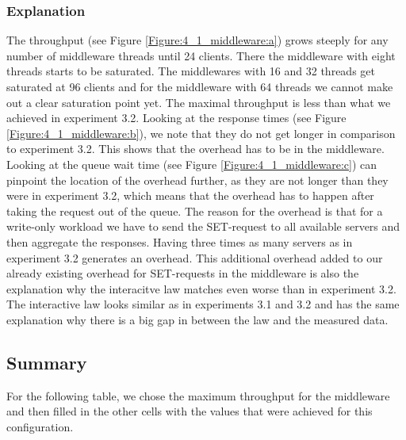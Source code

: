 \documentclass[11pt,a4paper]{article}
\begin{document}
\subsubsection{Explanation}
The throughput (see Figure \ref{Figure:4_1_middleware:a}) grows steeply for any number of middleware threads until 24 clients. There the middleware with eight threads starts to be saturated. The middlewares with 16 and 32 threads get saturated at 96 clients and for the middleware with 64 threads we cannot make out a clear saturation point yet. The maximal throughput is less than what we achieved in experiment 3.2. Looking at the response times (see Figure \ref{Figure:4_1_middleware:b}), we note that they do not get longer in comparison to experiment 3.2. This shows that the overhead has to be in the middleware. Looking at the queue wait time (see Figure \ref{Figure:4_1_middleware:c}) can pinpoint the location of the overhead further, as they are not longer than they were in experiment 3.2, which means that the overhead has to happen after taking the request out of the queue. The reason for the overhead is that for a write-only workload we have to send the SET-request to all available servers and then aggregate the responses. Having three times as many servers as in experiment 3.2 generates an overhead. This additional overhead added to our already existing overhead for SET-requests in the middleware is also the explanation why the interacitve law  matches even worse than in experiment 3.2. The interactive law looks similar as in experiments 3.1 and 3.2 and has the same explanation why there is a big gap in between the law and the measured data.

\subsection{Summary}

For the following table, we chose the maximum throughput for the middleware and then filled in the other cells with the values that were achieved for this configuration.
\end{document}
